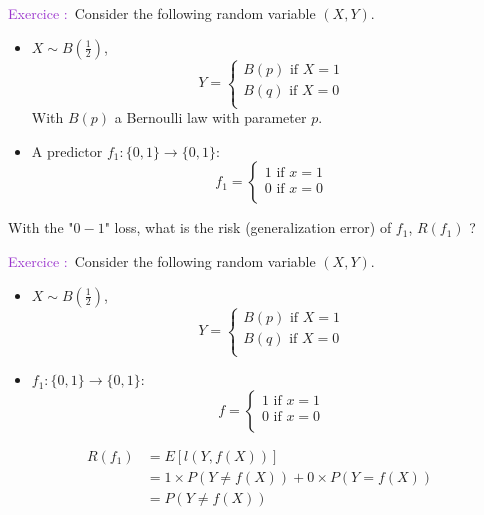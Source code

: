 \documentclass[usenames,dvipsnames]{beamer}
\newcounter{numexos}%
\newcommand{\exercice}[1]{%
\addtocounter{numexos}{1}%
\textcolor{DarkOrchid}{Exercice\,\thenumexos\,:}\,#1%
}
\begin{document}
\begin{frame}{}
    \exercice{} Consider the following random variable $(X,Y)$.
    \addtocounter{numexos}{-1}
    \begin{itemize}
        \item 
            $ X\sim B( \frac{1}{2} )$, 
         $$
            Y = \left\{
                \begin{array}{ll}
                    B(p) \text{ if } X=1   \\
                    B(q) \text{ if } X=0   \\
                \end{array}
                \right.
                $$
    With $B(p)$ a Bernoulli law with parameter $p$.
\item A predictor $f_1: \{0, 1\} \rightarrow \{0, 1\} $:
         $$
            f_1 = \left\{
                \begin{array}{ll}
                    1 \text{ if } x=1   \\
                    0 \text{ if } x=0   \\
                \end{array}
                \right.
                $$
    \end{itemize}
    With the "$0-1$" loss, what is the risk (generalization error) of $f_1$,
    $R(f_1)$ ?
\end{frame}

\begin{frame}{}
    \exercice{} Consider the following random variable $(X,Y)$.
    \begin{itemize}
        \item 
            $ X\sim B( \frac{1}{2} )$, 
         $$
            Y = \left\{
                \begin{array}{ll}
                    B(p) \text{ if } X=1   \\
                    B(q) \text{ if } X=0   \\
                \end{array}
                \right.
                $$
\item $f_1: \{0, 1\} \rightarrow \{0, 1\} $:
         $$
            f = \left\{
                \begin{array}{ll}
                    1 \text{ if } x=1   \\
                    0 \text{ if } x=0   \\
                \end{array}
                \right.
                $$
    \end{itemize}

    \begin{equation}
        \begin{aligned}
            \label{eq:}
            R(f_1)&= E[l(Y, f(X))] \\
            &= 1\times P(Y\neq f(X))+ 0\times P(Y=f(X))\\
            &= P(Y\neq f(X))
        \end{aligned}
    \end{equation}
\end{frame}
\end{document}
